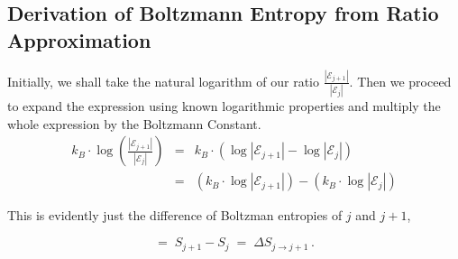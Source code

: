 \documentclass[journal=mamobx,manuscript=article]{achemso}
\begin{document}
\subsection{Derivation of Boltzmann Entropy from Ratio Approximation}

Initially, we shall take the natural logarithm of our ratio $\frac{|\mathcal{E}_{j+1}|}{|\mathcal{E}_{j}|}$. Then we proceed to expand the expression using known logarithmic properties and multiply the whole expression by the Boltzmann Constant.
\begin{eqnarray*}
k_B\cdot \log\left(\frac{|\mathcal{E}_{j+1}|}{|\mathcal{E}_{j}|}\right)  & = & 
k_B\cdot\left(\log\left|\mathcal{E}_{j+1}\right|-\log\left|\mathcal{E}_{j}\right|\right)  \\
&= & \left(k_B\cdot \log\left|\mathcal{E}_{j+1}\right|\right)-\left(k_B\cdot \log\left|\mathcal{E}_{j}\right|\right)
\end{eqnarray*}

\noindent This is evidently just the difference of Boltzman entropies of $j$ and $j+1$,

$$ =\; S_{j+1}-S_{j}\;=\; \Delta S_{j\to j+1} \,.$$




%
\end{document}
